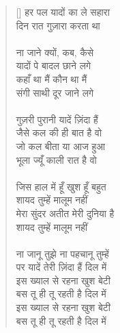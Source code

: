 \begin{verse}[\versewidth]
{हर पल यादों का ले सहारा\\
दिन रात गुज़ारा करता था\\
\\
ना जाने क्यों, कब, कैसे\\
यादों पे बादल छाने लगे\\
कहाँ था मैं कौन था मैं\\
संगी साथी दूर जाने लगे\\
\\
गुज़री पुरानी यादें ज़िंदा हैं\\
जैसे कल की ही बात है वो\\
जो कल बीता या आज हुआ\\
भूला ज्यूँ काली रात है वो\\
\\
जिस हाल में हूँ खुश हूँ बहुत\\
शायद तुम्हें मालूम नहीं\\
मेरा सुंदर अतीत मेरी दुनिया है\\
शायद तुम्हें मालूम नहीं\\
\\
ना जानू तुझे ना पहचानू तुम्हें\\
पर यादें तेरी ज़िंदा हैं दिल में\\
इस ख्याल से रहना खुश बेटी\\
बस तू ही तू रहती है दिल में\\
इस ख्याल से रहना खुश बेटी\\
बस तू ही तू रहती है दिल में
}\end{verse}

